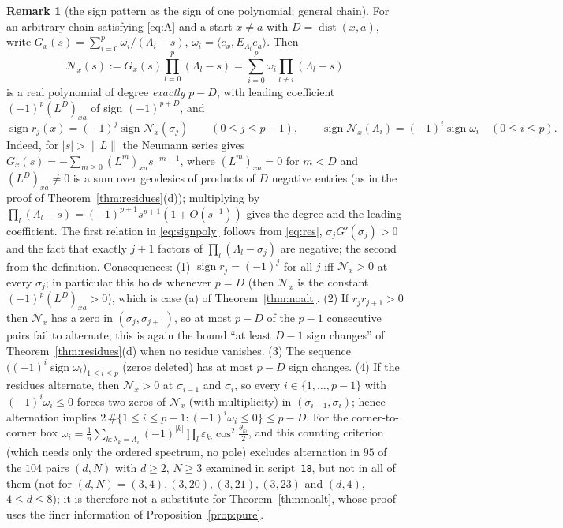 \documentclass[11pt,a4paper]{article}
\DeclareMathOperator{\dist}{dist}
\newcommand{\ip}[2]{\langle #1,#2\rangle}
\theoremstyle{plain}
\theoremstyle{definition}
\newtheorem{remark}[theorem]{Remark}
\numberwithin{equation}{section}
\begin{document}
\begin{remark}[the sign pattern as the sign of one polynomial; general chain]\label{rem:signpoly}
For an arbitrary chain satisfying \eqref{eq:A} and a start $x\ne a$ with $D=\dist(x,a)$, write $G_x(s)=\sum_{i=0}^p\omega_i/(\Lambda_i-s)$, $\omega_i=\ip{e_x}{E_{\Lambda_i}e_a}$. Then
\[
\mathcal N_x(s):=G_x(s)\prod_{l=0}^p(\Lambda_l-s)=\sum_{i=0}^p\omega_i\prod_{l\ne i}(\Lambda_l-s)
\]
is a real polynomial of degree \emph{exactly} $p-D$, with leading coefficient $(-1)^p(L^D)_{xa}$ of sign $(-1)^{p+D}$, and
\begin{equation}\label{eq:signpoly}
\operatorname{sign}r_j(x)=(-1)^j\operatorname{sign}\mathcal N_x(\sigma_j)\qquad(0\le j\le p-1),\qquad \operatorname{sign}\mathcal N_x(\Lambda_i)=(-1)^i\operatorname{sign}\omega_i\quad(0\le i\le p).
\end{equation}
Indeed, for $|s|>\|L\|$ the Neumann series gives $G_x(s)=-\sum_{m\ge0}(L^m)_{xa}s^{-m-1}$, where $(L^m)_{xa}=0$ for $m<D$ and $(L^D)_{xa}\neq0$ is a sum over geodesics of products of $D$ negative entries (as in the proof of Theorem~\ref{thm:residues}(d)); multiplying by $\prod_l(\Lambda_l-s)=(-1)^{p+1}s^{p+1}(1+O(s^{-1}))$ gives the degree and the leading coefficient. The first relation in \eqref{eq:signpoly} follows from \eqref{eq:res}, $\sigma_jG'(\sigma_j)>0$ and the fact that exactly $j+1$ factors of $\prod_l(\Lambda_l-\sigma_j)$ are negative; the second from the definition. Consequences: (1) $\operatorname{sign}r_j=(-1)^j$ for all $j$ iff $\mathcal N_x>0$ at every $\sigma_j$; in particular this holds whenever $p=D$ (then $\mathcal N_x$ is the constant $(-1)^p(L^D)_{xa}>0$), which is case (a) of Theorem~\ref{thm:noalt}. (2) If $r_jr_{j+1}>0$ then $\mathcal N_x$ has a zero in $(\sigma_j,\sigma_{j+1})$, so at most $p-D$ of the $p-1$ consecutive pairs fail to alternate; this is again the bound ``at least $D-1$ sign changes'' of Theorem~\ref{thm:residues}(d) when no residue vanishes. (3) The sequence $\big((-1)^i\operatorname{sign}\omega_i\big)_{1\le i\le p}$ (zeros deleted) has at most $p-D$ sign changes. (4) If the residues alternate, then $\mathcal N_x>0$ at $\sigma_{i-1}$ and $\sigma_i$, so every $i\in\{1,\dots,p-1\}$ with $(-1)^i\omega_i\le0$ forces two zeros of $\mathcal N_x$ (with multiplicity) in $(\sigma_{i-1},\sigma_i)$; hence alternation implies $2\,\#\{1\le i\le p-1:(-1)^i\omega_i\le0\}\le p-D$. For the corner-to-corner box $\omega_i=\frac1n\sum_{k:\lambda_k=\Lambda_i}(-1)^{|k|}\prod_l\varepsilon_{k_l}\cos^2\frac{\theta_{k_l}}2$, and this counting criterion (which needs only the ordered spectrum, no pole) excludes alternation in $95$ of the $104$ pairs $(d,N)$ with $d\ge2$, $N\ge3$ examined in script~\texttt{18}, but not in all of them (not for $(d,N)=(3,4),(3,20),(3,21),(3,23)$ and $(d,4)$, $4\le d\le8$); it is therefore not a substitute for Theorem~\ref{thm:noalt}, whose proof uses the finer information of Proposition~\ref{prop:pure}.
\end{remark}
\end{document}
